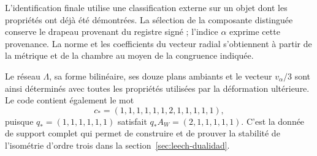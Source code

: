 L’identification finale utilise une classification
externe sur un objet dont les propriétés ont déjà
été démontrées. La sélection de la composante
distinguée conserve le drapeau provenant du
registre signé ; l’indice \(\alpha\) exprime
cette provenance. La norme et les coefficients du
vecteur radial s’obtiennent à partir de la métrique et de
la chambre au moyen de la congruence indiquée.

Le réseau \(\Lambda\), sa forme bilinéaire, ses
douze plans ambiants et le vecteur \(v_\alpha/3\)
sont ainsi déterminés avec toutes les propriétés
utilisées par la déformation ultérieure. Le
code contient également le mot
\[
 c_*=(1,1,1,1,1,1,2,1,1,1,1,1),
\]
puisque \(q_*=(1,1,1,1,1,1)\) satisfait \(q_*A_W=(2,1,1,1,1,1)\). C'est la donnée de support complet qui permet de construire et de prouver la stabilité de l'isométrie d'ordre trois dans la section~\ref{sec:leech-dualidad}.
